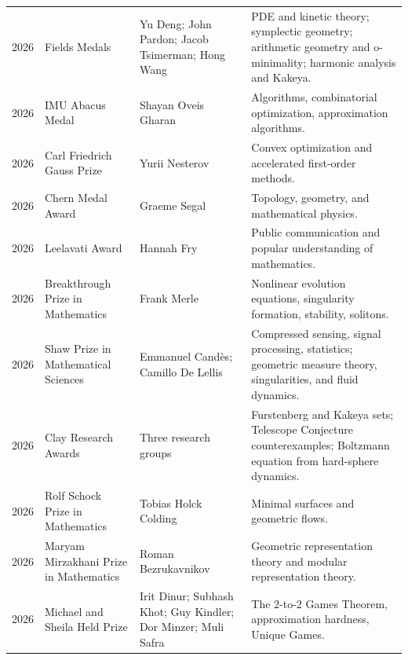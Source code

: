 {\begin{longtable}{@{}L{0.08\textwidth}L{0.25\textwidth}L{0.27\textwidth}L{0.32\textwidth}@{}}
        2026
        & Fields Medals
        & Yu Deng; John Pardon; Jacob Tsimerman; Hong Wang
        & PDE and kinetic theory; symplectic geometry; arithmetic geometry and
          o-minimality; harmonic analysis and Kakeya. \\

        2026
        & IMU Abacus Medal
        & Shayan Oveis Gharan
        & Algorithms, combinatorial optimization, approximation algorithms. \\

        2026
        & Carl Friedrich Gauss Prize
        & Yurii Nesterov
        & Convex optimization and accelerated first-order methods. \\

        2026
        & Chern Medal Award
        & Graeme Segal
        & Topology, geometry, and mathematical physics. \\

        2026
        & Leelavati Award
        & Hannah Fry
        & Public communication and popular understanding of mathematics. \\

        2026
        & Breakthrough Prize in Mathematics
        & Frank Merle
        & Nonlinear evolution equations, singularity formation, stability, solitons. \\

        2026
        & Shaw Prize in Mathematical Sciences
        & Emmanuel Cand\`es; Camillo De Lellis
        & Compressed sensing, signal processing, statistics; geometric measure
          theory, singularities, and fluid dynamics. \\

        2026
        & Clay Research Awards
        & Three research groups
        & Furstenberg and Kakeya sets; Telescope Conjecture counterexamples;
          Boltzmann equation from hard-sphere dynamics. \\

        2026
        & Rolf Schock Prize in Mathematics
        & Tobias Holck Colding
        & Minimal surfaces and geometric flows. \\

        2026
        & Maryam Mirzakhani Prize in Mathematics
        & Roman Bezrukavnikov
        & Geometric representation theory and modular representation theory. \\

        2026
        & Michael and Sheila Held Prize
        & Irit Dinur; Subhash Khot; Guy Kindler; Dor Minzer; Muli Safra
        & The $2$-to-$2$ Games Theorem, approximation hardness, Unique Games. \\


\end{longtable}}
